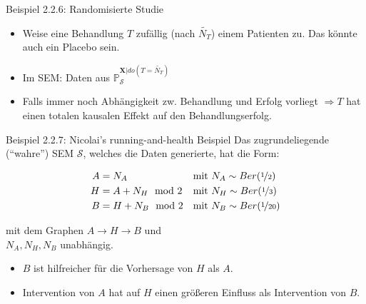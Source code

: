 \begin{frame}{Beispiel 2.2.6: Randomisierte Studie}
    \begin{itemize}
        \item<1-> Weise eine Behandlung $T$ zufällig (nach $\tilde{N_T}$) einem
              Patienten zu. Das könnte auch ein Placebo sein.
        \item<2-> Im SEM: Daten aus $\mathbb{P}_\mathcal{S}^{\mathbf{X}|do(T=\tilde{N_T})}$
        \item<3-> Falls immer noch Abhängigkeit zw. Behandlung und Erfolg
              vorliegt $\Rightarrow T$ hat einen totalen kausalen Effekt auf
              den Behandlungserfolg.
    \end{itemize}
\end{frame}

\begin{frame}{Beispiel 2.2.7: Nicolai's running-and-health Beispiel}
    Das zugrundeliegende (\enquote{wahre}) SEM $\mathcal{S}$, welches die Daten
    generierte, hat die Form:

    \begin{align}
        A &= N_A            &&\text{mit } N_A \sim Ber(\nicefrac{1}{2})\\
        H &= A + N_H \mod 2 &&\text{mit } N_H \sim Ber(\nicefrac{1}{3})\\
        B &= H + N_B \mod 2 &&\text{mit } N_B \sim Ber(\nicefrac{1}{20})
    \end{align}

    mit dem Graphen $A \rightarrow H \rightarrow B$ und\\
    $N_A, N_H, N_B$ unabhängig.

    \begin{itemize}
        \item<1->  $B$ ist hilfreicher für die Vorhersage von $H$ als $A$.
        \item<2->  Intervention von $A$ hat auf $H$ einen größeren Einfluss als Intervention von $B$.
    \end{itemize}
\end{frame}

